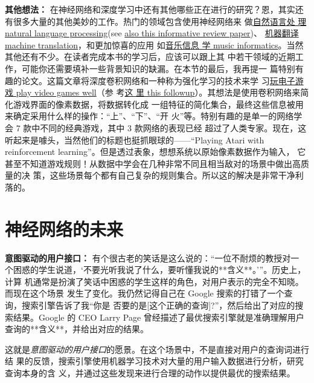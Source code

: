 \textbf{其他想法：} 在神经网络和深度学习中还有其他哪些正在进行的研究？恩，其实还
有很多大量的其他美妙的工作。热门的领域包含使用神经网络来
做\href{http://machinelearning.org/archive/icml2008/papers/391.pdf}{自然语言处
  理 natural language processing}(see \href{http://arxiv.org/abs/1103.0398}{also
  this informative review
  paper})、
\href{http://papers.nips.cc/paper/5346-information-based-learning-by-agents-in-unbounded-state-spaces}{
  机器翻译 machine translation}，和更加惊喜的应用
如\href{http://yann.lecun.com/exdb/publis/pdf/humphrey-jiis-13.pdf}{音乐信息
  学 music informatics}。当然其他还有不少。在读者完成本书的学习后，应该可以跟上其
中若干领域的近期工作，可能你还需要填补一些背景知识的缺漏。在本节的最后，我再提一
篇特别有趣的论文。这篇文章将深度卷积网络和一种称为强化学习的技术来学
习\href{http://www.cs.toronto.edu/~vmnih/docs/dqn.pdf}{玩电子游戏 play video
  games well}（参
考\href{http://www.nature.com/nature/journal/v518/n7540/abs/nature14236.html}{这
  里 this followup}）。其想法是使用卷积网络来简化游戏界面的像素数据，将数据转化成
一组特征的简化集合，最终这些信息被用来确定采用什么样的操作：“上”、“下”、“开
火”等。特别有趣的是单一的网络学会 7 款中不同的经典游戏，其中 3 款网络的表现已经
超过了人类专家。现在，这听起来是噱头，当然他们的标题也挺抓眼球的——“Playing
Atari with reinforcement learning”。但是透过表象，想想系统以原始像素数据作为输入，
它甚至不知道游戏规则！从数据中学会在几种非常不同且相当敌对的场景中做出高质量的决
策，这些场景每个都有自己复杂的规则集合。所以这的解决是非常干净利落的。

\section{神经网络的未来}
\label{sec:on_the_future_of_neural_networks}

\textbf{意图驱动的用户接口：} 有个很古老的笑话是这么说的：“一位不耐烦的教授对一
个困惑的学生说道，‘不要光听我说了什么，要听懂我说的**含义**。’”。历史上，计算
机通常是扮演了笑话中困惑的学生这样的角色，对用户表示的完全不知晓。而现在这个场景
发生了变化。我仍然记得自己在 Google 搜索的打错了一个查询，搜索引擎告诉了我“你是
否要的是[这个正确的查询]?”，然后给出了对应的搜索结果。Google 的 CEO Larry Page
曾经描述了最优搜索引擎就是准确理解用户查询的**含义**，并给出对应的结果。

这就是\emph{意图驱动的用户接口}的愿景。在这个场景中，不是直接对用户的查询词进行结
果的反馈，搜索引擎使用机器学习技术对大量的用户输入数据进行分析，研究查询本身的含
义，并通过这些发现来进行合理的动作以提供最优的搜索结果。

